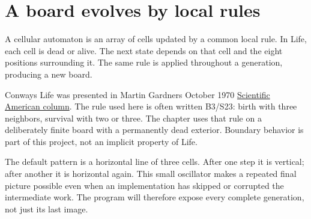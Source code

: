 \section{A board evolves by local
  rules}\label{008-life-generations-p00-a-board-evolves-by-local-rules}

A cellular automaton is an array of cells updated by a common local
rule. In Life, each cell is dead or alive. The next state depends on
that cell and the eight positions surrounding it. The same rule is
applied throughout a generation, producing a new board.

Conway\textquotesingle s Life was presented in Martin
Gardner\textquotesingle s October 1970
\href{https://www.scientificamerican.com/article/mathematical-games-1970-10/}{Scientific
  American column}. The rule used here is often written B3/S23: birth with
three neighbors, survival with two or three. The chapter uses that rule
on a deliberately finite board with a permanently dead exterior.
Boundary behavior is part of this project, not an implicit property of
Life.

The default pattern is a horizontal line of three cells. After one step
it is vertical; after another it is horizontal again. This small
oscillator makes a repeated final picture possible even when an
implementation has skipped or corrupted the intermediate work. The
program will therefore expose every complete generation, not just its
last image.
